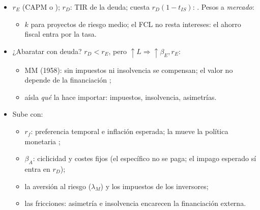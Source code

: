 \documentclass{article}
\begin{document}
\begin{columnas}
\begin{itemize}
\item $r_E$ (CAPM o ); $r_D$: TIR de la deuda; cuesta $r_D(1-t_{IS})$: . Pesos a \emph{mercado}:
  \begin{itemize}
  \item $k$ para proyectos de riesgo medio; el FCL no resta intereses: el ahorro fiscal entra por la tasa.
  \end{itemize}
\item ¿Abaratar con deuda? $r_D<r_E$, pero $\uparrow L\Rightarrow\uparrow\beta_E,r_E$:
  \begin{itemize}
  \item MM (1958): sin impuestos ni insolvencia se compensan; el valor no depende de la financiación ;
  \item aísla \emph{qué} la hace importar: impuestos, insolvencia, asimetrías.
  \end{itemize}
\end{itemize}
\begin{itemize}
\item Sube con:
  \begin{itemize}
  \item $r_f$: preferencia temporal e inflación esperada; la mueve la política monetaria ;
  \item $\beta_A$: ciclicidad y costes fijos (el específico no se paga; el impago esperado sí entra en $r_D$);
  \item la aversión al riesgo ($\lambda_M$) y los impuestos de los inversores;
  \item las fricciones: asimetría e insolvencia encarecen la financiación externa.
  \end{itemize}
\end{itemize}


\end{columnas}
\end{document}
